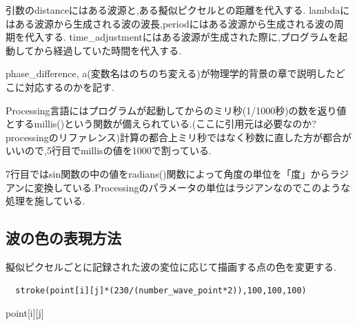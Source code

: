 引数のdistanceにはある波源と,ある擬似ピクセルとの距離を代入する.
lambdaにはある波源から生成される波の波長,periodにはある波源から生成される波の周期を代入する.
time\_adjustmentにはある波源が生成された際に,プログラムを起動してから経過していた時間を代入する.

phase\_difference, a(変数名はのちのち変える)が物理学的背景の章で説明したどこに対応するのかを記す.

Processing言語にはプログラムが起動してからのミリ秒(1/1000秒)の数を返り値とするmillis()という関数が備えられている.(ここに引用元は必要なのか?processingのリファレンス)計算の都合上ミリ秒ではなく秒数に直した方が都合がいいので,5行目でmillisの値を1000で割っている.

7行目ではsin関数の中の値をradians()関数によって角度の単位を「度」からラジアンに変換している.Processingのパラメータの単位はラジアンなのでこのような処理を施している.



\subsection{波の色の表現方法}
擬似ピクセルごとに記録された波の変位に応じて描画する点の色を変更する.
\begin{screen}
{\small
\begin{verbatim}
  stroke(point[i][j]*(230/(number_wave_point*2)),100,100,100)\end{verbatim}}
\end{screen}
point[i][j]








